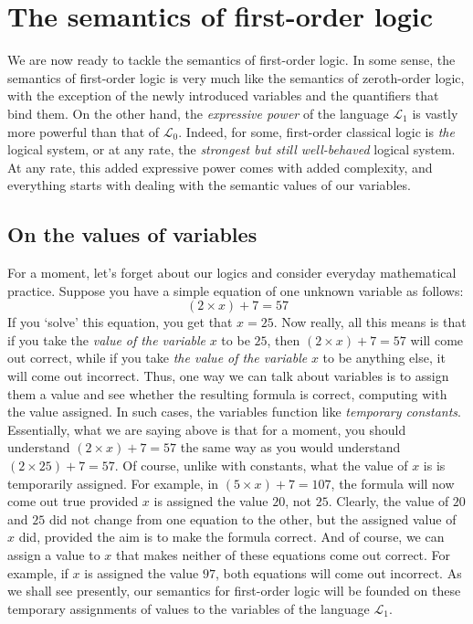 \chapter{The semantics of first-order logic}

We are now ready to tackle the semantics of first-order logic. In some sense, the semantics of first-order logic is very much like the semantics of zeroth-order logic, with the exception of the newly introduced variables and the quantifiers that bind them. On the other hand, the \textit{expressive power} of the language $\mathcal{L}_1$ is vastly more powerful than that of $\mathcal{L}_0$. Indeed, for some, first-order classical logic is \textit{the} logical system, or at any rate, the \textit{strongest but still well-behaved} logical system. At any rate, this added expressive power comes with added complexity, and everything starts with dealing with the semantic values of our variables. 

\section{On the values of variables}

For a moment, let's forget about our logics and consider everyday mathematical practice. Suppose you have a simple equation of one unknown variable as follows: 
\[
(2\times x)+7=57
\]
If you `solve' this equation, you get that $x=25$. Now really, all this means is that if you take the \textit{value of the variable} $x$ to be $25$, then $(2\times x)+7=57$ will come out correct, while if you take \textit{the value of the variable} $x$ to be anything else, it will come out incorrect. Thus, one way we can talk about variables is to assign them a value and see whether the resulting formula is correct, computing with the value assigned. In such cases, the variables function like \textit{temporary constants}. Essentially, what we are saying above is that for a moment, you should understand $(2\times x)+7=57$ the same way as you would understand $(2 \times 25) + 7= 57$. Of course, unlike with constants, what the value of $x$ is is temporarily assigned. For example, in $(5 \times x)+7=107$, the formula will now come out true provided $x$ is assigned the value $20$, not $25$. Clearly, the value of $20$ and $25$ did not change from one equation to the other, but the assigned value of $x$ did, provided the aim is to make the formula correct. And of course, we can assign a value to $x$ that makes neither of these equations come out correct. For example, if $x$ is assigned the value $97$, both equations will come out incorrect. As we shall see presently, our semantics for first-order logic will be founded on these temporary assignments of values to the variables of the language $\mathcal{L}_1$.

